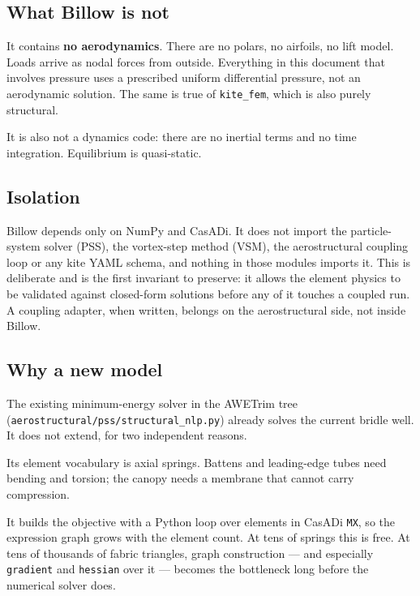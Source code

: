 \documentclass[11pt,a4paper]{article}
\newcommand{\code}[1]{\texttt{\small #1}}
\begin{document}
\subsection{What Billow is not}

It contains \textbf{no aerodynamics}. There are no polars, no airfoils, no
lift model. Loads arrive as nodal forces from outside. Everything in this
document that involves pressure uses a prescribed uniform differential
pressure, not an aerodynamic solution. The same is true of \code{kite\_fem},
which is also purely structural.

It is also not a dynamics code: there are no inertial terms and no time
integration. Equilibrium is quasi-static.

\subsection{Isolation}

Billow depends only on NumPy and CasADi. It does not import the particle-system
solver (PSS), the vortex-step method (VSM), the aerostructural coupling loop or
any kite YAML schema, and nothing in those modules imports it. This is
deliberate and is the first invariant to preserve: it allows the element physics
to be validated against closed-form solutions before any of it touches a coupled
run. A coupling adapter, when written, belongs on the aerostructural side, not
inside Billow.

\subsection{Why a new model}

The existing minimum-energy solver in the AWETrim tree
(\code{aerostructural/pss/structural\_nlp.py}) already solves the current bridle
well. It does not extend, for two independent reasons.

\begin{description}[style=unboxed,leftmargin=1.2em]
\item[Physics.] Its element vocabulary is axial springs. Battens and
leading-edge tubes need bending and torsion; the canopy needs a membrane that
cannot carry compression.
\item[Scale.] It builds the objective with a Python loop over elements in
CasADi \code{MX}, so the expression graph grows with the element count. At tens
of springs this is free. At tens of thousands of fabric triangles, graph
construction --- and especially \code{gradient} and \code{hessian} over it ---
becomes the bottleneck long before the numerical solver does.
\end{description}
\end{document}
